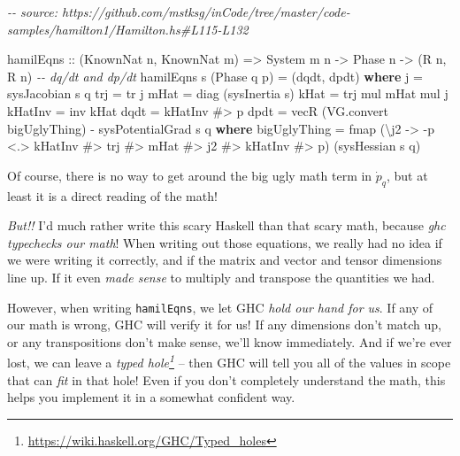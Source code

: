 \documentclass[]{article}
\newenvironment{Shaded}{}{}
\newcommand{\CommentTok}[1]{\textcolor[rgb]{0.38,0.63,0.69}{\textit{#1}}}
\newcommand{\DataTypeTok}[1]{\textcolor[rgb]{0.56,0.13,0.00}{#1}}
\newcommand{\FunctionTok}[1]{\textcolor[rgb]{0.02,0.16,0.49}{#1}}
\newcommand{\KeywordTok}[1]{\textcolor[rgb]{0.00,0.44,0.13}{\textbf{#1}}}
\newcommand{\NormalTok}[1]{#1}
\newcommand{\OperatorTok}[1]{\textcolor[rgb]{0.40,0.40,0.40}{#1}}
\newcommand{\OtherTok}[1]{\textcolor[rgb]{0.00,0.44,0.13}{#1}}
\renewcommand{\href}[2]{#2\footnote{\url{#1}}}
\begin{document}
\begin{Shaded}
\begin{Highlighting}[]
\CommentTok{{-}{-} source: https://github.com/mstksg/inCode/tree/master/code{-}samples/hamilton1/Hamilton.hs\#L115{-}L132}

\NormalTok{hamilEqns}
\OtherTok{    ::}\NormalTok{ (}\DataTypeTok{KnownNat}\NormalTok{ n, }\DataTypeTok{KnownNat}\NormalTok{ m)}
    \OtherTok{=>} \DataTypeTok{System}\NormalTok{ m n}
    \OtherTok{{-}>} \DataTypeTok{Phase}\NormalTok{ n}
    \OtherTok{{-}>}\NormalTok{ (}\DataTypeTok{R}\NormalTok{ n, }\DataTypeTok{R}\NormalTok{ n)       }\CommentTok{{-}{-} dq/dt and dp/dt}
\NormalTok{hamilEqns s (}\DataTypeTok{Phase}\NormalTok{ q p) }\OtherTok{=}\NormalTok{ (dqdt, dpdt)}
  \KeywordTok{where}
\NormalTok{    j       }\OtherTok{=}\NormalTok{ sysJacobian s q}
\NormalTok{    trj     }\OtherTok{=}\NormalTok{ tr j}
\NormalTok{    mHat    }\OtherTok{=}\NormalTok{ diag (sysInertia s)}
\NormalTok{    kHat    }\OtherTok{=}\NormalTok{ trj }\OtherTok{\textasciigrave{}mul\textasciigrave{}}\NormalTok{ mHat }\OtherTok{\textasciigrave{}mul\textasciigrave{}}\NormalTok{ j}
\NormalTok{    kHatInv }\OtherTok{=}\NormalTok{ inv kHat}
\NormalTok{    dqdt    }\OtherTok{=}\NormalTok{ kHatInv }\OperatorTok{\#>}\NormalTok{ p}
\NormalTok{    dpdt    }\OtherTok{=}\NormalTok{ vecR (VG.convert bigUglyThing) }\OperatorTok{{-}}\NormalTok{ sysPotentialGrad s q}
      \KeywordTok{where}
\NormalTok{        bigUglyThing }\OtherTok{=}
          \FunctionTok{fmap}\NormalTok{ (\textbackslash{}j2 }\OtherTok{{-}>} \OperatorTok{{-}}\NormalTok{p }\OperatorTok{<.>}\NormalTok{ kHatInv }\OperatorTok{\#>}\NormalTok{ trj }\OperatorTok{\#>}\NormalTok{ mHat }\OperatorTok{\#>}\NormalTok{ j2 }\OperatorTok{\#>}\NormalTok{ kHatInv }\OperatorTok{\#>}\NormalTok{ p)}
\NormalTok{               (sysHessian s q)}
\end{Highlighting}
\end{Shaded}

Of course, there is no way to get around the big ugly math term in
\(\dot{p}_q\), but at least it is a direct reading of the math!

\emph{But!!} I'd much rather write this scary Haskell than that scary math,
because \emph{ghc typechecks our math}! When writing out those equations, we
really had no idea if we were writing it correctly, and if the matrix and vector
and tensor dimensions line up. If it even \emph{made sense} to multiply and
transpose the quantities we had.

However, when writing \texttt{hamilEqns}, we let GHC \emph{hold our hand for
us}. If any of our math is wrong, GHC will verify it for us! If any dimensions
don't match up, or any transpositions don't make sense, we'll know immediately.
And if we're ever lost, we can leave a
\emph{\href{https://wiki.haskell.org/GHC/Typed_holes}{typed hole}} -- then GHC
will tell you all of the values in scope that can \emph{fit} in that hole! Even
if you don't completely understand the math, this helps you implement it in a
somewhat confident way.
\end{document}
